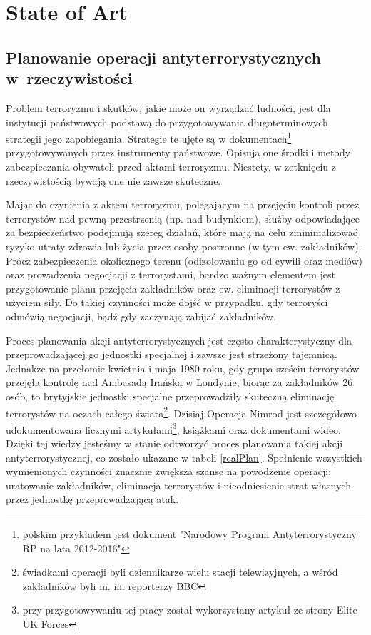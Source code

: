 \chapter{State of Art}
\section{Planowanie operacji antyterrorystycznych w~rzeczywistości}
Problem terroryzmu i skutków, jakie może on wyrządzać ludności, jest dla instytucji państwowych podstawą do przygotowywania długoterminowych strategii jego zapobiegania. Strategie te ujęte są w dokumentach\footnote{polskim przykładem jest dokument "Narodowy Program Antyterrorystyczny RP na lata 2012-2016"} przygotowywanych przez instrumenty państwowe. Opisują one środki i metody zabezpieczania obywateli przed aktami terroryzmu. Niestety, w zetknięciu z rzeczywistością bywają one nie zawsze skuteczne.

Mając do czynienia z aktem terroryzmu, polegającym na przejęciu kontroli przez terrorystów nad pewną przestrzenią (np. nad budynkiem), służby odpowiadające za bezpieczeństwo podejmują szereg działań, które mają na celu zminimalizować ryzyko utraty zdrowia lub życia przez osoby postronne (w tym ew. zakładników). Prócz zabezpieczenia okolicznego terenu (odizolowaniu go od cywili oraz mediów) oraz prowadzenia negocjacji z terrorystami, bardzo ważnym elementem jest przygotowanie planu przejęcia zakładników oraz ew. eliminacji terrorystów z użyciem siły. Do takiej czynności może dojść w przypadku, gdy terroryści odmówią negocjacji, bądź gdy zaczynają zabijać zakładników.

Proces planowania akcji antyterrorystycznych jest często charakterystyczny dla przeprowadzającej go jednostki specjalnej i zawsze jest strzeżony tajemnicą. Jednakże na przełomie kwietnia i maja 1980 roku, gdy grupa sześciu terrorystów przejęła kontrolę nad Ambasadą Irańską w Londynie, biorąc za zakładników 26 osób, to brytyjskie jednostki specjalne przeprowadziły skuteczną eliminację terrorystów na oczach całego świata\footnote{świadkami operacji byli dziennikarze wielu stacji telewizyjnych, a wśród zakładników byli m. in. reporterzy BBC}. Dzisiaj Operacja Nimrod jest szczegółowo udokumentowana licznymi artykułami\footnote{przy przygotowywaniu tej pracy został wykorzystany artykuł ze strony Elite UK Forces\cite{eliteUK}}, książkami oraz dokumentami wideo. Dzięki tej wiedzy jesteśmy w stanie odtworzyć proces planowania takiej akcji antyterrorystycznej, co zostało ukazane w tabeli \ref{realPlan}. Spełnienie wszystkich wymienionych czynności znacznie zwiększa szanse na powodzenie operacji: uratowanie zakładników, eliminacja terrorystów i nieodniesienie strat własnych przez jednostkę przeprowadzającą atak.

